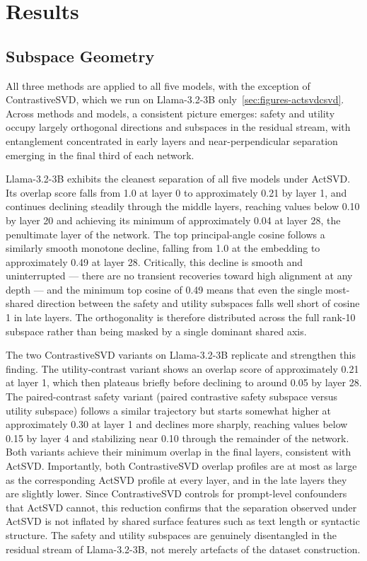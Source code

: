 \section{Results}
\subsection{Subspace Geometry}
All three methods are applied to all five models,
with the exception of ContrastiveSVD, which we run on Llama-3.2-3B
only~\ref{sec:figures-actsvdcsvd}. Across methods and models, a
consistent picture emerges: safety and utility occupy largely
orthogonal directions and subspaces in the residual stream, with
entanglement concentrated in early layers and near-perpendicular
separation emerging in the final third of each network.

Llama-3.2-3B exhibits the cleanest separation of all five models
under ActSVD. Its overlap score falls from 1.0 at layer 0 to
approximately 0.21 by layer 1, and continues declining steadily
through the middle layers, reaching values below 0.10 by layer 20
and achieving its minimum of approximately 0.04 at layer 28, the
penultimate layer of the network. The top principal-angle cosine
follows a similarly smooth monotone decline, falling from 1.0 at
the embedding to approximately 0.49 at layer 28. Critically, this
decline is smooth and uninterrupted --- there are no transient
recoveries toward high alignment at any depth --- and the minimum
top cosine of 0.49 means that even the single most-shared direction
between the safety and utility subspaces falls well short of
cosine 1 in late layers. The orthogonality is therefore distributed
across the full rank-10 subspace rather than being masked by a
single dominant shared axis.

The two ContrastiveSVD variants on Llama-3.2-3B replicate and
strengthen this finding. The utility-contrast variant shows an overlap score of
approximately 0.21 at layer 1, which then plateaus briefly before
declining to around 0.05 by layer 28. The paired-contrast safety
variant (paired contrastive safety subspace versus utility subspace)
follows a similar trajectory but starts somewhat higher at
approximately 0.30 at layer 1 and declines more sharply, reaching
values below 0.15 by layer 4 and stabilizing near 0.10 through
the remainder of the network. Both variants achieve their minimum
overlap in the final layers, consistent with ActSVD. Importantly,
both ContrastiveSVD overlap profiles are at most as large as the
corresponding ActSVD profile at every layer, and in the late layers
they are slightly lower. Since ContrastiveSVD controls for
prompt-level confounders that ActSVD cannot, this reduction confirms
that the separation observed under ActSVD is not inflated by shared
surface features such as text length or syntactic structure. The
safety and utility subspaces are genuinely disentangled in the
residual stream of Llama-3.2-3B, not merely artefacts of the
dataset construction.

